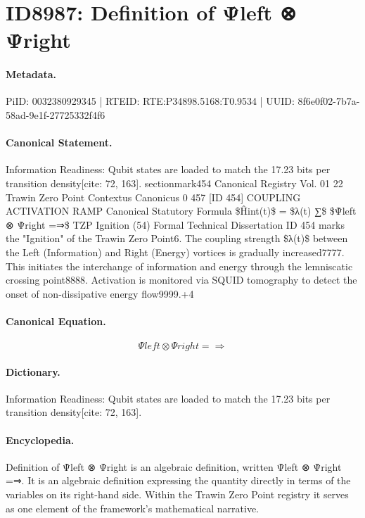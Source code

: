 \section*{ID8987: Definition of Ψ̂left ⊗ Ψ̂right}
\paragraph{Metadata.}
PiID: 0032380929345 | RTEID: RTE:P34898.5168:T0.9534 | UUID: 8f6e0f02-7b7a-58ad-9e1f-27725332f4f6

\paragraph{Canonical Statement.}
Information Readiness: Qubit states are loaded to match the 17.23 bits per transition density[cite: 72, 163]. sectionmark454 Canonical Registry Vol. 01 22 Trawin Zero Point Contextus Canonicus 0 457 [ID 454] COUPLING ACTIVATION RAMP Canonical Statutory Formula \$Ĥint(t)\$ = \$λ(t) ∑\$ \$Ψ̂left ⊗ Ψ̂right =⇒\$ TZP Ignition (54) Formal Technical Dissertation ID 454 marks the "Ignition" of the Trawin Zero Point6. The coupling strength \$λ(t)\$ between the Left (Information) and Right (Energy) vortices is gradually increased7777. This initiates the interchange of information and energy through the lemniscatic crossing point8888. Activation is monitored via SQUID tomography to detect the onset of non-dissipative energy flow9999.+4

\paragraph{Canonical Equation.}
\[
Ψ̂left ⊗ Ψ̂right =⇒
\]

\paragraph{Dictionary.}
Information Readiness: Qubit states are loaded to match the 17.23 bits per transition density[cite: 72, 163].

\paragraph{Encyclopedia.}
Definition of Ψ̂left ⊗ Ψ̂right is an algebraic definition, written Ψ̂left ⊗ Ψ̂right =⇒. It is an algebraic definition expressing the quantity directly in terms of the variables on its right-hand side. Within the Trawin Zero Point registry it serves as one element of the framework's mathematical narrative.
